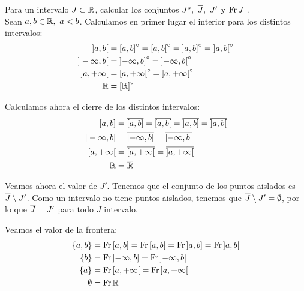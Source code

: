 \begin{ejercicio}
    Para un intervalo $J \subset \mathbb{R}$, calcular los conjuntos $J^\circ,~\overline{J},~J'$ y $\operatorname{Fr} J$ .\\

    Sean $a,b\in \mathbb{R},~a<b$. Calculamos en primer lugar el interior para los distintos intervalos:
    \begin{equation*}\begin{split}
        ]a,b[ &= \left[a,b\right]^\circ = \left[a,b\right[^\circ= \left]a,b\right]^\circ= \left]a,b\right[^\circ \\
        ]-\infty, b[ &= \left]-\infty, b\right]^\circ = \left]-\infty,b \right[^\circ\\
        ]a, +\infty[ &= \left[a,+\infty\right[^\circ = \left]a,+\infty\right[^\circ \\
        \mathbb{R}&=\left[\mathbb{R}\right]^\circ
    \end{split}\end{equation*}


    Calculamos ahora el cierre de los distintos intervalos:
    \begin{equation*}\begin{split}
        [a,b] &= \ol{\left[a,b\right]} = \ol{\left[a,b\right[}= \ol{\left]a,b\right]}= \ol{\left]a,b\right[} \\
        ]-\infty, b] &= \ol{\left]-\infty, b\right]} = \ol{\left]-\infty,b \right[}\\
        [a, +\infty[ &= \ol{\left[a,+\infty\right[} = \ol{\left]a,+\infty\right[} \\
        \bb{R}&=\ol{\bb{R}}
    \end{split}\end{equation*}

    Veamos ahora el valor de $J'$. Tenemos que el conjunto de los puntos aislados es $\overline{J}\setminus J'$. Como un intervalo no tiene puntos aislados, tenemos que $\overline{J}\setminus J'=\emptyset$, por lo que $\overline{J}=J'$ para todo $J$ intervalo.
    
    Veamos el valor de la frontera:
    \begin{equation*}\begin{split}
        \{a,b\} &= \operatorname{Fr}{\left[a,b\right]} = \operatorname{Fr}{\left[a,b\right[}= \operatorname{Fr}{\left]a,b\right]}= \operatorname{Fr}{\left]a,b\right[} \\
        \{b\} &= \operatorname{Fr}{\left]-\infty, b\right]} = \operatorname{Fr}{\left]-\infty,b \right[}\\
        \{a\} &= \operatorname{Fr}{\left[a,+\infty\right[} = \operatorname{Fr}{\left]a,+\infty\right[} \\
        \emptyset&=\operatorname{Fr} \mathbb{R}
    \end{split}\end{equation*}
\end{ejercicio}

